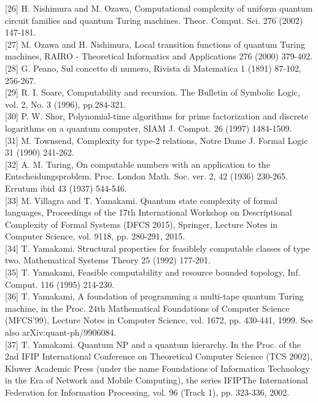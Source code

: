 \documentclass[10pt]{article}
\begin{document}
[26] H. Nishimura and M. Ozawa, Computational complexity of uniform quantum circuit families and quantum Turing machines. Theor. Comput. Sci. 276 (2002) 147-181.\\[0pt]
[27] M. Ozawa and H. Nishimura, Local transition functions of quantum Turing machines, RAIRO - Theoretical Informatics and Applications 276 (2000) 379-402.\\[0pt]
[28] G. Peano, Sul concetto di numero, Rivista di Matematica 1 (1891) 87-102, 256-267.\\[0pt]
[29] R. I. Soare, Computability and recursion. The Bulletin of Symbolic Logic, vol. 2, No. 3 (1996), pp.284-321.\\[0pt]
[30] P. W. Shor, Polynomial-time algorithms for prime factorization and discrete logarithms on a quantum computer, SIAM J. Comput. 26 (1997) 1484-1509.\\[0pt]
[31] M. Townsend, Complexity for type-2 relations, Notre Dame J. Formal Logic 31 (1990) 241-262.\\[0pt]
[32] A. M. Turing, On computable numbers with an application to the Entscheidungsproblem. Proc. London Math. Soc. ver. 2, 42 (1936) 230-265. Errutum ibid 43 (1937) 544-546.\\[0pt]
[33] M. Villagra and T. Yamakami. Quantum state complexity of formal languages, Proceedings of the 17th International Workshop on Descriptional Complexity of Formal Systems (DFCS 2015), Springer, Lecture Notes in Computer Science, vol. 9118, pp. 280-291, 2015.\\[0pt]
[34] T. Yamakami. Structural properties for feasiblely computable classes of type two. Mathematical Systems Theory 25 (1992) 177-201.\\[0pt]
[35] T. Yamakami, Feasible computability and resource bounded topology, Inf. Comput. 116 (1995) 214-230.\\[0pt]
[36] T. Yamakami, A foundation of programming a multi-tape quantum Turing machine, in the Proc. 24th Mathematical Foundations of Computer Science (MFCS'99), Lecture Notes in Computer Science, vol. 1672, pp. 430-441, 1999. See also arXiv:quant-ph/9906084.\\[0pt]
[37] T. Yamakami. Quantum NP and a quantum hierarchy. In the Proc. of the 2nd IFIP International Conference on Theoretical Computer Science (TCS 2002), Kluwer Academic Press (under the name Foundations of Information Technology in the Era of Network and Mobile Computing), the series IFIPThe International Federation for Information Processing, vol. 96 (Track 1), pp. 323-336, 2002.\\[0pt]
\end{document}
